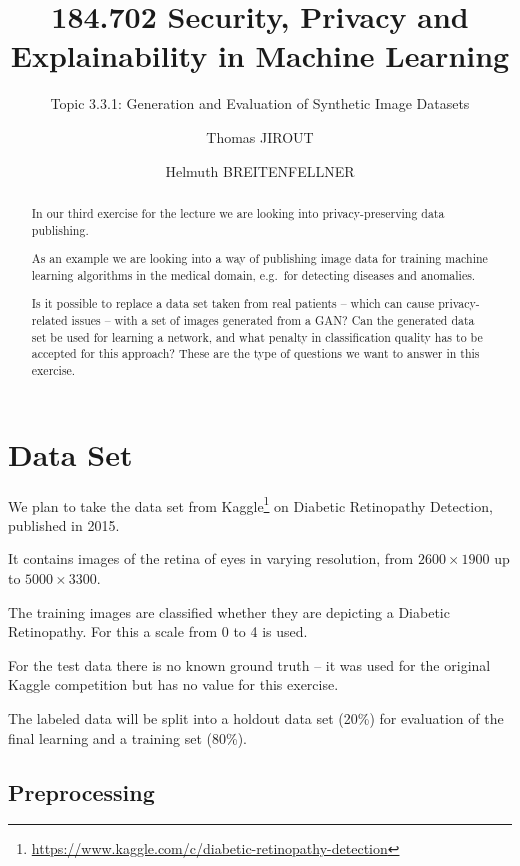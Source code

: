 \documentclass[sigconf,nonacm]{acmart}
\begin{document}
\title{184.702 Security, Privacy and Explainability in Machine Learning}
\subtitle{Topic 3.3.1: Generation and Evaluation
of Synthetic Image Datasets}
\author{Thomas JIROUT}
\author{Helmuth BREITENFELLNER}
\begin{abstract}
In our third exercise for the lecture we are looking into
privacy-preserving data publishing.

As an example we are looking into a way of publishing image
data for training machine learning algorithms in the medical
domain, e.g.\ for
detecting diseases and anomalies.

Is it possible to replace a data set taken from real patients --
which can cause privacy-related issues -- with a set of images
generated from a GAN?
Can the generated data set be used for learning a network,
and what penalty in classification quality has to be
accepted for this approach?
These are the type of questions we want to answer in this exercise.
\end{abstract}
\maketitle

\section{Data Set}

We plan to take the data set from Kaggle\footnote{\url{https://www.kaggle.com/c/diabetic-retinopathy-detection}}
on
Diabetic Retinopathy Detection, published in 2015.

It contains images of the retina of eyes in varying resolution,
from $2600\times1900$ up to $5000\times3300$.

The training images are classified whether they are
depicting a Diabetic Retinopathy.
For this a scale from 0 to 4 is used.

For the test data there is no known ground truth -- it
was used for the original Kaggle
competition but has no value for this exercise.

The labeled data will be split into a holdout data set (20\%)
for evaluation
of the final learning and a training set (80\%).

\subsection{Preprocessing}
\end{document}
